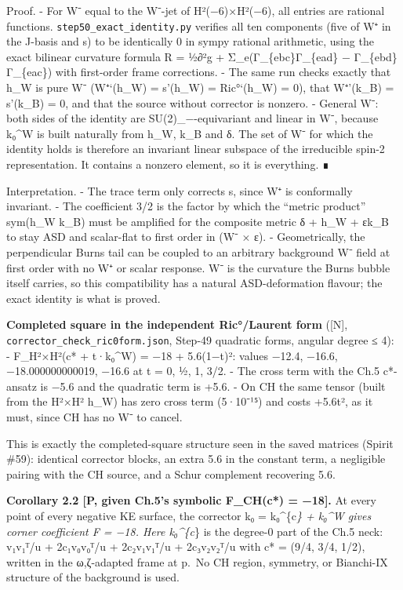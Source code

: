 \documentclass[
  10pt,
]{report}
\begin{document}
Proof. - For W⁻ equal to the W⁻-jet of H²(−6)×H²(−6), all entries are
rational functions. \texttt{step50\_exact\_identity.py} verifies all ten
components (five of W⁺ in the J-basis and s) to be identically 0 in
sympy rational arithmetic, using the exact bilinear curvature formula R
= ½∂²g + Σ\_e(Γ\_\{ebc\}Γ\_\{ead\} − Γ\_\{ebd\}Γ\_\{eac\}) with
first-order frame corrections. - The same run checks exactly that h\_W
is pure W⁻ (W⁺`(h\_W) = s'(h\_W) = Ric°`(h\_W) = 0), that W⁺'(k\_B) =
s'(k\_B) = 0, and that the source without corrector is nonzero. -
General W⁻: both sides of the identity are SU(2)\_−-equivariant and
linear in W⁻, because k₀\^{}W is built naturally from h\_W, k\_B and δ.
The set of W⁻ for which the identity holds is therefore an invariant
linear subspace of the irreducible spin-2 representation. It contains a
nonzero element, so it is everything. ∎

Interpretation. - The trace term only corrects s, since W⁺ is
conformally invariant. - The coefficient 3/2 is the factor by which the
``metric product'' sym(h\_W k\_B) must be amplified for the composite
metric δ + h\_W + εk\_B to stay ASD and scalar-flat to first order in
(W⁻ × ε). - Geometrically, the perpendicular Burns tail can be coupled
to an arbitrary background W⁻ field at first order with no W⁺ or scalar
response. W⁻ is the curvature the Burns bubble itself carries, so this
compatibility has a natural ASD-deformation flavour; the exact identity
is what is proved.

\textbf{Completed square in the independent Ric°/Laurent form} ({[}N{]},
\texttt{corrector\_check\_ric0form.json}, Step-49 quadratic forms,
angular degree ≤ 4): - F\_H²×H²(c* + t·k₀\^{}W) = −18 + 5.6(1−t)²:
values −12.4, −16.6, −18.000000000019, −16.6 at t = 0, ½, 1, 3/2. - The
cross term with the Ch.5 c*-ansatz is −5.6 and the quadratic term is
+5.6. - On CH the same tensor (built from the H²×H² h\_W) has zero cross
term (5·10⁻¹⁵) and costs +5.6t², as it must, since CH has no W⁻ to
cancel.

This is exactly the completed-square structure seen in the saved
matrices (Spirit \#59): identical corrector blocks, an extra 5.6 in the
constant term, a negligible pairing with the CH source, and a Schur
complement recovering 5.6.

\textbf{Corollary 2.2 {[}P, given Ch.5's symbolic F\_CH(c*) = −18{]}.}
At every point of every negative KE surface, the corrector k₀ =
k₀\^{}\{c\emph{\} + k₀\^{}W gives corner coefficient F = −18. Here
k₀\^{}\{c}\} is the degree-0 part of the Ch.5 neck: v₁v₁ᵀ/u + 2c₁v₀v₀ᵀ/u
+ 2c₂v₁v₁ᵀ/u + 2c₃v₂v₂ᵀ/u with c* = (9/4, 3/4, 1/2), written in the
ω,ζ-adapted frame at p.~No CH region, symmetry, or Bianchi-IX structure
of the background is used.
\end{document}
